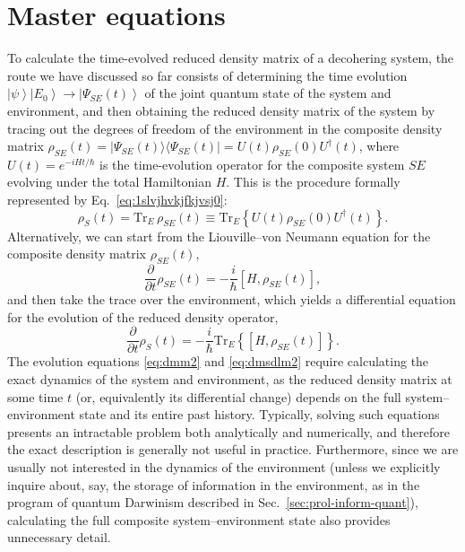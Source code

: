 \documentclass[3p,sort&compress,12pt]{elsarticle}
\newcommand{\ket}[1]{\left\vert{#1}\right\rangle}
\newcommand{\ketbra}[2]{\ensuremath{|{#1 \rangle}{\langle #2}|}}
\newcommand{\E}{\ensuremath{e}}
\newcommand{\I}{\ensuremath{i}}
\newcommand{\op}[1]{#1}
\begin{document}
\section{\label{sec:mastereqs}Master equations}

To calculate the time-evolved reduced density matrix of a decohering system, the route we have discussed so far consists of determining the time evolution $\ket{\psi}\ket{E_0} \longrightarrow \ket{\Psi_{SE}(t)}$ of the joint quantum state of the system and environment, and then obtaining the reduced density matrix of the system by tracing out the degrees of freedom of the environment in the composite density matrix $\op{\rho}_{SE}(t) = \ketbra{\Psi_{SE}(t)}{\Psi_{SE}(t)}=  U(t) \op{\rho}_{SE}(0) U^\dagger(t)$, where $U(t) = \E^{-\I \op{H} t/\hbar}$ is the time-evolution operator for the composite system $SE$ evolving under the total Hamiltonian $\op{H}$.  This is the procedure formally represented by Eq.~\eqref{eq:1slvjhvkjfkjvsj0}:
%
\begin{equation}
\label{eq:dmm2}
  \op{\rho}_S(t) = \text{Tr}_E \, \op{\rho}_{SE}(t) \equiv \text{Tr}_{E} \left\{ U(t) \op{\rho}_{SE}(0) U^\dagger(t) \right\}.
\end{equation}
%
Alternatively, we can start from the Liouville--von Neumann equation for the composite density matrix $\op{\rho}_{SE}(t)$,
\begin{equation}
\label{eq:dmm2xdfvb}
  \frac{\partial}{\partial t} \op{\rho}_{SE}(t) = -\frac{\I}{\hbar} \left[ \op{H}, \op{\rho}_{SE}(t)\right],
\end{equation}
%
and then take the trace over the environment, which yields a differential equation for the evolution of the reduced density operator,
%
\begin{equation}
\label{eq:dmsdlm2}
  \frac{\partial}{\partial t} \op{\rho}_S(t) = -\frac{\I}{\hbar} \text{Tr}_{E} \left\{ \left[ \op{H}, \op{\rho}_{SE}(t)\right]\right\}.
\end{equation}
%
The evolution equations \eqref{eq:dmm2} and \eqref{eq:dmsdlm2} require calculating the exact dynamics of the system and environment, as the reduced density matrix at some time $t$ (or, equivalently its differential change) depends on the full system--environment state and its entire past history. Typically, solving such equations presents an intractable problem both analytically and numerically, and therefore the exact description is generally not useful in practice. Furthermore, since we are usually not interested in the dynamics of the environment (unless we explicitly inquire about, say, the storage of information in the environment, as in the program of quantum Darwinism described in Sec.~\ref{sec:prol-inform-quant}), calculating the full composite system--environment state also provides unnecessary detail. 
\end{document}
